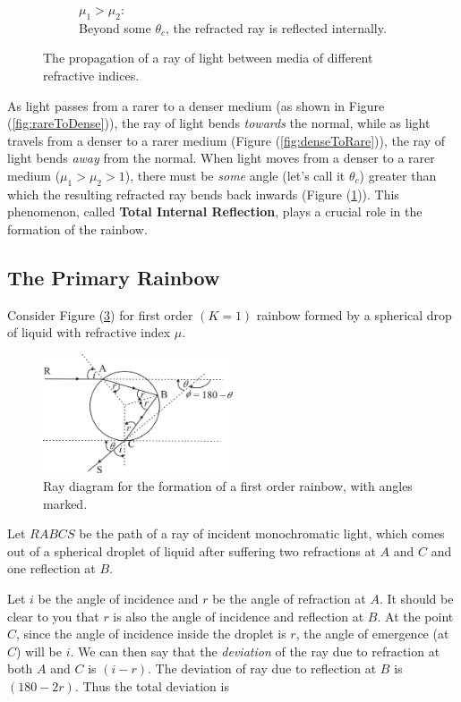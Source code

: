\begin{figure}[!htb]
\begin{subfigure}[b]{\textwidth}
                \caption{$\mu_1>\mu_2:$\\ Beyond some $\theta_c$, the refracted ray is reflected internally.}
                \label{fig:til}
        \end{subfigure}
        \caption{The propagation of a ray of light between media of different refractive indices.}\label{fig:snells}
\end{figure}


As light passes from a rarer to a denser medium (as shown in Figure (\ref{fig:rareToDense})), the ray of light bends \textit{towards} the normal, while as light travels from a denser to a rarer medium (Figure (\ref{fig:denseToRare})), the ray of light bends \textit{away} from the normal. When light moves from a denser to a rarer medium ($\mu_1>\mu_2>1$), there must be \textit{some} angle (let's call it $\theta_c$) greater than which the resulting refracted ray bends back inwards (Figure (\ref{fig:til})). This phenomenon, called \textbf{Total Internal Reflection}, plays a crucial role in the formation of the rainbow.



\subsection*{The Primary Rainbow}

Consider Figure (\ref{fig:firstorder1}) for first order $(K = 1)$ rainbow formed by a spherical drop of liquid with refractive index $\mu$.

\begin{figure}[!htb]
    \centering
    \includegraphics[width=0.5\textwidth]{figs/img3.jpg}
    \caption{Ray diagram for the formation of a first order rainbow, with angles marked.}
    \label{fig:firstorder1}
\end{figure}


Let $RABCS$ be the path of a ray of incident monochromatic light, which comes out of a spherical droplet of liquid after suffering two refractions at $A$ and $C$ and one reflection at $B$.

Let $i$ be the angle of incidence and $r$ be the angle of refraction at $A$. It should be clear to you that $r$ is also the angle of incidence and reflection at $B$. At the point $C$, since the angle of incidence inside the droplet is $r$, the angle of emergence (at $C$) will be $i$. We can then say that the \textit{deviation} of the ray due to refraction at both $A$ and $C$ is $(i-r)$. The deviation of ray due to reflection at $B$ is $(180 - 2r)$. Thus the total deviation is

